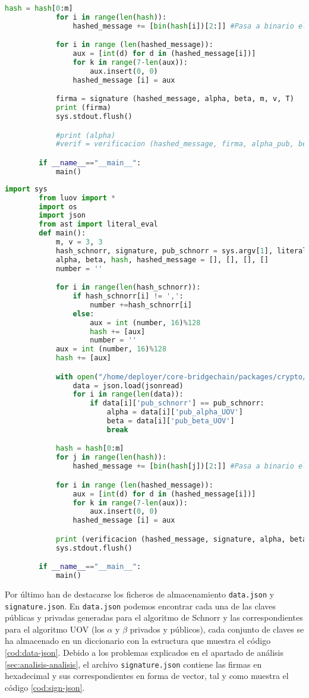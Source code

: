 \begin{itemize}
\begin{lstlisting}[language=Python,caption=Archivo \texttt{signature.py}, label=cod:sign-py]
			hash = hash[0:m]
			for i in range(len(hash)):
				hashed_message += [bin(hash[i])[2:]] #Pasa a binario el hash

			for i in range (len(hashed_message)):
				aux = [int(d) for d in (hashed_message[i])]
				for k in range(7-len(aux)):
					aux.insert(0, 0)
				hashed_message [i] = aux

			firma = signature (hashed_message, alpha, beta, m, v, T)
			print (firma)
			sys.stdout.flush()

			#print (alpha)
			#verif = verificacion (hashed_message, firma, alpha_pub, beta_pub, m)

		if __name__=="__main__":
			main()
	\end{lstlisting}

	\vspace{-0.41cm}
	\begin{lstlisting}[language=Python,caption=Archivo \texttt{verify.py}, label=cod:veri-py]
		import sys
		from luov import *
		import os
		import json
		from ast import literal_eval
		def main():
			m, v = 3, 3
			hash_schnorr, signature, pub_schnorr = sys.argv[1], literal_eval(sys.argv[2]), sys.argv[3]
			alpha, beta, hash, hashed_message = [], [], [], []
			number = ''

			for i in range(len(hash_schnorr)):
				if hash_schnorr[i] != ',':
					number +=hash_schnorr[i]
				else:
					aux = int (number, 16)%128
					hash += [aux]
					number = ''
			aux = int (number, 16)%128
			hash += [aux]

			with open("/home/deployer/core-bridgechain/packages/crypto/src/crypto/data.json", "r") as jsonread:
				data = json.load(jsonread)
				for i in range(len(data)):
					if data[i]['pub_schnorr'] == pub_schnorr:
						alpha = data[i]['pub_alpha_UOV']
						beta = data[i]['pub_beta_UOV']
						break

			hash = hash[0:m]
			for j in range(len(hash)):
				hashed_message += [bin(hash[j])[2:]] #Pasa a binario el hash

			for i in range (len(hashed_message)):
				aux = [int(d) for d in (hashed_message[i])]
				for k in range(7-len(aux)):
					aux.insert(0, 0)
				hashed_message [i] = aux

			print (verificacion (hashed_message, signature, alpha, beta, m))
			sys.stdout.flush()

		if __name__=="__main__":
			main()
	\end{lstlisting}
	
	Por último han de destacarse los ficheros de almacenamiento \texttt{data.json} y \texttt{signature.json}. En \texttt{data.json} podemos encontrar cada una de las claves públicas y privadas generadas para el algoritmo de Schnorr y las correspondientes para el algoritmo UOV (los $\alpha$ y $\beta$ privados y públicos), cada conjunto de claves se ha almacenado en un diccionario con la estructura que muestra el código \ref{cod:data-json}. Debido a los problemas explicados en el apartado de análisis \ref{sec:analisis-analisis}, el archivo \texttt{signature.json} contiene las firmas en hexadecimal y sus correspondientes en forma de vector, tal y como muestra el código \ref{cod:sign-json}.
	

\end{itemize}
